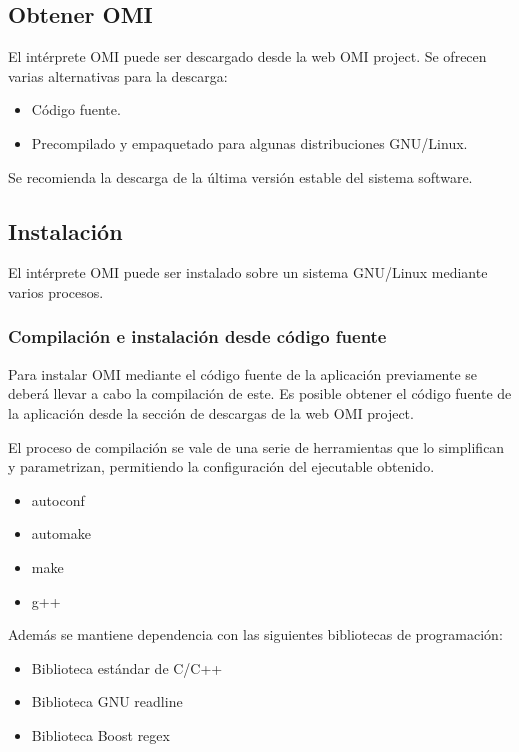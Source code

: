 \subsection{Obtener OMI}
El intérprete OMI puede ser descargado desde la web OMI project. Se ofrecen varias 
alternativas para la descarga:

\begin{itemize}
\item Código fuente.
\item Precompilado y empaquetado para algunas distribuciones GNU/Linux.
\end{itemize}

Se recomienda la descarga de la última versión estable del sistema software. 
 
\subsection{Instalación}
El intérprete OMI puede ser instalado sobre un sistema GNU/Linux mediante varios procesos. 

\subsubsection{Compilación e instalación desde código fuente} \label{sec:compile}
Para instalar OMI mediante el código fuente de la aplicación previamente se deberá llevar a cabo la compilación de este. 
Es posible obtener el código fuente de la aplicación desde la sección de descargas de la web OMI project. 

El proceso de compilación se vale de una serie de herramientas que lo simplifican y parametrizan, permitiendo la configuración
del ejecutable obtenido.

\begin{itemize}
\item autoconf
\item automake
\item make
\item g++
\end{itemize}

Además se mantiene dependencia con las siguientes bibliotecas de programación:

\begin{itemize}
\item Biblioteca estándar de C/C++
\item Biblioteca GNU readline
\item Biblioteca Boost regex
\end{itemize}

